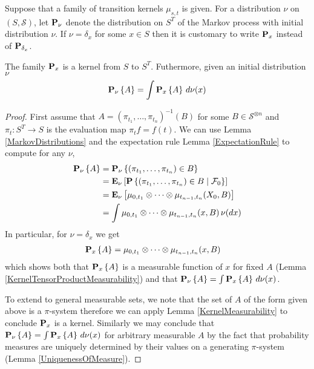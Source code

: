 \begin{defn}Suppose that a family of transition kernels $\mu_{s,t}$ is
  given.  For a distribution $\nu$ on $(S, \mathcal{S})$, let
  $\sprobabilityop{\nu}$ denote the distribution on $S^T$ of the
  Markov process with initial distribution $\nu$.  If $\nu=\delta_x$
  for some $x \in S$ then it is customary to write
  $\sprobabilityop{x}$ instead of $\sprobabilityop{\delta_x}$.
\end{defn}
\begin{lem}\label{MarkovMixtures}The family $\sprobabilityop{x}$ is a kernel from $S$ to
  $S^T$.  Futhermore, given an initial distribution $\nu$
\begin{align*}
\sprobability{A}{\nu} = \int \sprobability{A}{x} \, d\nu(x)
\end{align*}
\end{lem}
\begin{proof}
First assume that $A = (\pi_{t_1}, \dots, \pi_{t_n})^{-1}(B)$ for some
$B \in \mathcal{S}^{\otimes n}$ and $\pi_t : S^T \to S$ is the evaluation map $\pi_t f = f(t)$.  
We can use Lemma \ref{MarkovDistributions} and the expectation rule Lemma \ref{ExpectationRule}
to compute for any $\nu$,
\begin{align*}
\sprobability{A}{\nu} &= \sprobability{(\pi_{t_1}, \dotsc,  \pi_{t_n}) \in B}{\nu} \\
&=\sexpectation{\cprobability{\mathcal{F}_0}{(\pi_{t_1}, \dotsc,  \pi_{t_n}) \in B}}{\nu} \\
&=\sexpectation{\mu_{0, t_1} \otimes \cdots \otimes \mu_{t_{n-1}, t_n}(X_0, B)}{\nu} \\
&= \int \mu_{0, t_1} \otimes \cdots \otimes \mu_{t_{n-1}, t_n}(x,B) \, \nu(dx)
\end{align*}
In particular, for $\nu = \delta_x$ we get
\begin{align*}
\sprobability{A}{x} &=\mu_{0, t_1} \otimes \cdots \otimes \mu_{t_{n-1},  t_n}(x,B)
\end{align*}
which shows both that $\sprobability{A}{x}$ is a measurable function
of $x$ for fixed $A$ (Lemma
\ref{KernelTensorProductMeasurability}) and that
$\sprobability{A}{\nu} = \int \sprobability{A}{x} \, d\nu(x)$.

To extend to general measurable sets, we note that the set of $A$ of
the form given above is a $\pi$-system therefore we can apply Lemma
\ref{KernelMeasurability} to conclude $\sprobabilityop{x}$ is a
kernel.  Similarly we may conclude that $\sprobability{A}{\nu} = \int
\sprobability{A}{x} \, d\nu(x)$ for arbitrary measurable $A$ by the fact that probability measures
are uniquely determined by their values on a generating $\pi$-system
(Lemma \ref{UniquenessOfMeasure}).
\end{proof}

